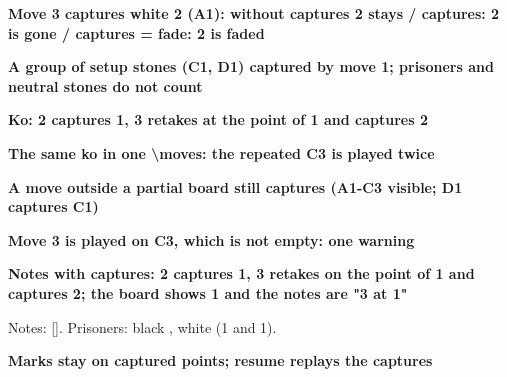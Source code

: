 \documentclass{article}
\newcommand\case[1]{\par\medskip\noindent\textbf{#1}\par\nopagebreak}
\begin{document}
\case{Move 3 captures white 2 (A1): without captures 2 stays / captures: 2 is gone / captures = fade: 2 is faded}
\begin{goban}[5]\end{goban}
\begin{goban}[5, captures]\end{goban}
\begin{goban}[5, captures = fade]\end{goban}

\case{A group of setup stones (C1, D1) captured by move 1; prisoners and neutral stones do not count}
\begin{goban}[5, captures]
\end{goban}
\begin{goban}[5, captures = fade]
\end{goban}

\case{Ko: 2 captures 1, 3 retakes at the point of 1 and captures 2}
\begin{goban}[5, captures]
\end{goban}

\case{The same ko in one \textbackslash moves: the repeated C3 is played twice}
\begin{goban}[5, captures]
\end{goban}

\case{A move outside a partial board still captures (A1-C3 visible; D1 captures C1)}
\begin{goban}[5, captures, partial = A1:C3, label = {at = all}]
\end{goban}

\case{Move 3 is played on C3, which is not empty: one warning}
\begin{goban}[5, captures]\end{goban}

\case{Notes with captures: 2 captures 1, 3 retakes on the point of 1 and captures 2; the board shows 1 and the notes are "3 at 1"}
\begin{goban}
\end{goban}
Notes: [\pgfgomovenotes]. Prisoners: black , white  (1 and 1).

\case{Marks stay on captured points; resume replays the captures}
\begin{goban}[5, name = capt, captures]
\end{goban}
\begin{goban}[5, resume = {capt, numbers, marks}]\end{goban}
\end{document}
